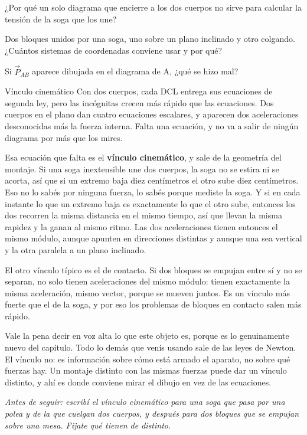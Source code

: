 \documentclass[11pt,openany]{book}
\begin{document}
\begin{chequeo}
\item ¿Por qué un solo diagrama que encierre a los dos cuerpos no sirve para calcular la tensión de la soga que los une?
\item Dos bloques unidos por una soga, uno sobre un plano inclinado y otro colgando. ¿Cuántos sistemas de coordenadas conviene usar y por qué?
\item Si $\vec P_{AB}$ aparece dibujada en el diagrama de A, ¿qué se hizo mal?
\end{chequeo}

\begin{bloque}{Vínculo cinemático}
Con dos cuerpos, cada DCL entrega sus ecuaciones de segunda ley, pero las incógnitas crecen más rápido que las ecuaciones. Dos cuerpos en el plano dan cuatro ecuaciones escalares, y aparecen dos aceleraciones desconocidas más la fuerza interna. Falta una ecuación, y no va a salir de ningún diagrama por más que los mires.

Esa ecuación que falta es el \textbf{vínculo cinemático}, y sale de la geometría del montaje. Si una soga inextensible une dos cuerpos, la soga no se estira ni se acorta, así que si un extremo baja diez centímetros el otro sube diez centímetros. Eso no lo sabés por ninguna fuerza, lo sabés porque mediste la soga. Y si en cada instante lo que un extremo baja es exactamente lo que el otro sube, entonces los dos recorren la misma distancia en el mismo tiempo, así que llevan la misma rapidez y la ganan al mismo ritmo. Las dos aceleraciones tienen entonces el mismo módulo, aunque apunten en direcciones distintas y aunque una sea vertical y la otra paralela a un plano inclinado.

El otro vínculo típico es el de contacto. Si dos bloques se empujan entre sí y no se separan, no solo tienen aceleraciones del mismo módulo: tienen exactamente la misma aceleración, mismo vector, porque se mueven juntos. Es un vínculo más fuerte que el de la soga, y por eso los problemas de bloques en contacto salen más rápido.

Vale la pena decir en voz alta lo que este objeto es, porque es lo genuinamente nuevo del capítulo. Todo lo demás que venís usando sale de las leyes de Newton. El vínculo no: es información sobre cómo está armado el aparato, no sobre qué fuerzas hay. Un montaje distinto con las mismas fuerzas puede dar un vínculo distinto, y ahí es donde conviene mirar el dibujo en vez de las ecuaciones.

\textit{Antes de seguir: escribí el vínculo cinemático para una soga que pasa por una polea y de la que cuelgan dos cuerpos, y después para dos bloques que se empujan sobre una mesa. Fijate qué tienen de distinto.}
\end{bloque}
\end{document}
